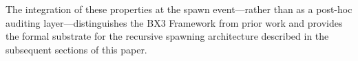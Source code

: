 The integration of these properties at the spawn event---rather than as a post-hoc auditing layer---distinguishes the BX3 Framework from prior work and provides the formal substrate for the recursive spawning architecture described in the subsequent sections of this paper.




%
